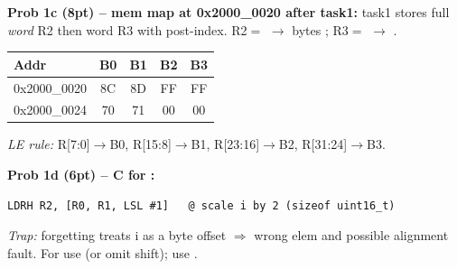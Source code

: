 \begin{qp}\textbf{Prob 1c (8pt) -- mem map at 0x2000\_0020 after task1:}
task1 stores full \emph{word} R2 then word R3 with post-index. R2$=$ $\to$ bytes ; R3$=$ $\to$ .
\begin{center}\scriptsize
\begin{tabular}{@{}lcccc@{}}
\toprule
Addr & B0 & B1 & B2 & B3 \\
\midrule
0x2000\_0020 & 8C & 8D & FF & FF \\
0x2000\_0024 & 70 & 71 & 00 & 00 \\
\bottomrule
\end{tabular}
\end{center}
\emph{LE rule:} R[7:0]$\to$B0, R[15:8]$\to$B1, R[23:16]$\to$B2, R[31:24]$\to$B3.
\end{qp}

\begin{qp}\textbf{Prob 1d (6pt) -- C  for :}
\begin{lstlisting}
LDRH R2, [R0, R1, LSL #1]   @ scale i by 2 (sizeof uint16_t)
\end{lstlisting}
\emph{Trap:} forgetting  treats i as a byte offset $\Rightarrow$ wrong elem and possible alignment fault. For  use  (or omit shift);  use .
\end{qp}

